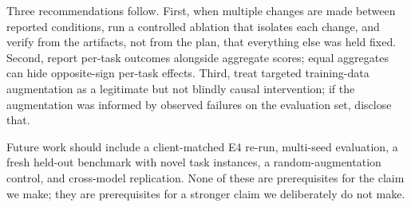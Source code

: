 \documentclass[10pt,twocolumn]{article}
\begin{document}
Three recommendations follow. First, when multiple changes are made between reported conditions, run a controlled ablation that isolates each change, and verify from the artifacts, not from the plan, that everything else was held fixed. Second, report per-task outcomes alongside aggregate scores; equal aggregates can hide opposite-sign per-task effects. Third, treat targeted training-data augmentation as a legitimate but not blindly causal intervention; if the augmentation was informed by observed failures on the evaluation set, disclose that.

Future work should include a client-matched E4 re-run, multi-seed evaluation, a fresh held-out benchmark with novel task instances, a random-augmentation control, and cross-model replication. None of these are prerequisites for the claim we make; they are prerequisites for a stronger claim we deliberately do not make.



\end{document}
